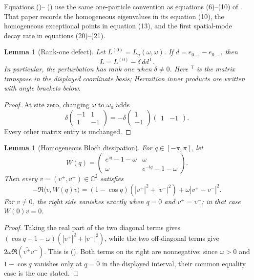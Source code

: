 \documentclass[twoside,10pt]{article}
\numberwithin{equation}{section}
\theoremstyle{slbody}
\newtheorem{lemma}[theorem]{Lemma}
\theoremstyle{definition}
\theoremstyle{remark}
\newcommand{\C}{\mathbb C}
\newcommand{\ii}{\mathrm i}
\renewcommand{\eqref}[1]{%
  \textup{{\normalfont(\oldstylenums{\ref{#1}}}\normalfont)}}
\begin{document}
Equations \eqref{eq:generator-plus}--\eqref{eq:generator-minus} use the
same one-particle convention as equations (6)--(10) of
\cite{MallminBlytheEvans2019}.  That paper records the homogeneous
eigenvalues in its equation (10), the homogeneous exceptional points in
equation (13), and the first spatial-mode decay rate in equations
(20)--(21).

\begin{lemma}[Rank-one defect]\label{lem:rank-one}
Let $L^{(0)}=L_n(\omega,\omega)$.  If
$d=e_{0,+}-e_{0,-}$, then
\[
 L=L^{(0)}-\delta\,dd^{\mathsf T}.
\]
In particular, the perturbation has rank one when $\delta\ne0$.
Here ${}^{\mathsf T}$ is the matrix transpose in the displayed coordinate
basis; Hermitian inner products are written with angle brackets below.
\end{lemma}

\begin{proof}
At site zero, changing $\omega$ to $\omega_0$ adds
\[
 \delta\begin{pmatrix}-1&1\\1&-1\end{pmatrix}
 =-\delta\begin{pmatrix}1\\-1\end{pmatrix}
             \begin{pmatrix}1&-1\end{pmatrix}.
\]
Every other matrix entry is unchanged.
\end{proof}

\begin{lemma}[Homogeneous Bloch dissipation]
\label{lem:bloch-dissipation}
For $q\in[-\pi,\pi]$, let
\[
 W(q)=\begin{pmatrix}
 e^{\ii q}-1-\omega&\omega\\
 \omega&e^{-\ii q}-1-\omega
 \end{pmatrix}.
\]
Then every $v=(v^+,v^-)\in\C^2$ satisfies
\begin{equation}\label{eq:bloch-dissipation}
 -\Re\langle v,W(q)v\rangle
 =(1-\cos q)(|v^+|^2+|v^-|^2)
   +\omega|v^+-v^-|^2.
\end{equation}
For $v\ne0$, the right side vanishes exactly when $q=0$ and
$v^+=v^-$; in that case $W(0)v=0$.
\end{lemma}

\begin{proof}
Taking the real part of the two diagonal terms gives
$(\cos q-1-\omega)(|v^+|^2+|v^-|^2)$, while the two off-diagonal
terms give $2\omega\Re(\overline{v^+}v^-)$.  This is
\eqref{eq:bloch-dissipation}.  Both terms on its right are nonnegative;
since $\omega>0$ and $1-\cos q$ vanishes only at $q=0$ in the displayed
interval, their common equality case is the one stated.
\end{proof}
\end{document}
